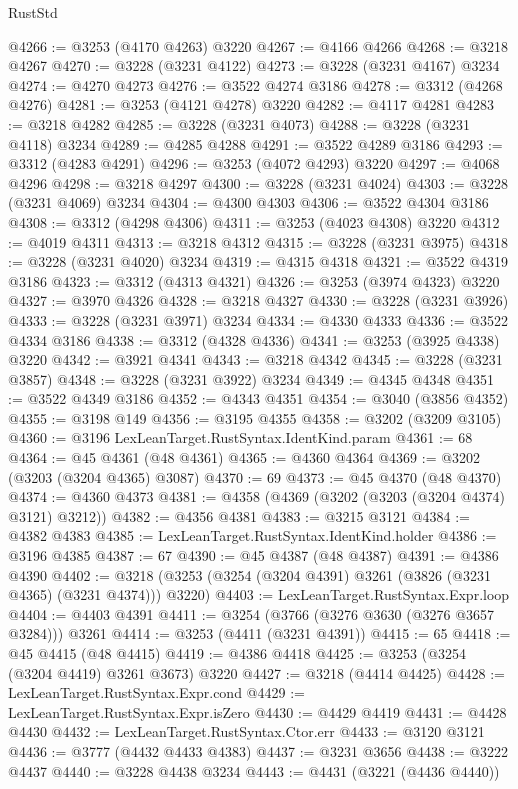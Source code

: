 \begin{lexlean}{RustStd}
\begin{coremodule}
@4266 := @3253 (@4170 @4263) @3220
@4267 := @4166 @4266
@4268 := @3218 @4267
@4270 := @3228 (@3231 @4122)
@4273 := @3228 (@3231 @4167) @3234
@4274 := @4270 @4273
@4276 := @3522 @4274 @3186
@4278 := @3312 (@4268 @4276)
@4281 := @3253 (@4121 @4278) @3220
@4282 := @4117 @4281
@4283 := @3218 @4282
@4285 := @3228 (@3231 @4073)
@4288 := @3228 (@3231 @4118) @3234
@4289 := @4285 @4288
@4291 := @3522 @4289 @3186
@4293 := @3312 (@4283 @4291)
@4296 := @3253 (@4072 @4293) @3220
@4297 := @4068 @4296
@4298 := @3218 @4297
@4300 := @3228 (@3231 @4024)
@4303 := @3228 (@3231 @4069) @3234
@4304 := @4300 @4303
@4306 := @3522 @4304 @3186
@4308 := @3312 (@4298 @4306)
@4311 := @3253 (@4023 @4308) @3220
@4312 := @4019 @4311
@4313 := @3218 @4312
@4315 := @3228 (@3231 @3975)
@4318 := @3228 (@3231 @4020) @3234
@4319 := @4315 @4318
@4321 := @3522 @4319 @3186
@4323 := @3312 (@4313 @4321)
@4326 := @3253 (@3974 @4323) @3220
@4327 := @3970 @4326
@4328 := @3218 @4327
@4330 := @3228 (@3231 @3926)
@4333 := @3228 (@3231 @3971) @3234
@4334 := @4330 @4333
@4336 := @3522 @4334 @3186
@4338 := @3312 (@4328 @4336)
@4341 := @3253 (@3925 @4338) @3220
@4342 := @3921 @4341
@4343 := @3218 @4342
@4345 := @3228 (@3231 @3857)
@4348 := @3228 (@3231 @3922) @3234
@4349 := @4345 @4348
@4351 := @3522 @4349 @3186
@4352 := @4343 @4351
@4354 := @3040 (@3856 @4352)
@4355 := @3198 @149
@4356 := @3195 @4355
@4358 := @3202 (@3209 @3105)
@4360 := @3196 LexLeanTarget.RustSyntax.IdentKind.param
@4361 := 68
@4364 := @45 @4361 (@48 @4361)
@4365 := @4360 @4364
@4369 := @3202 (@3203 (@3204 @4365) @3087)
@4370 := 69
@4373 := @45 @4370 (@48 @4370)
@4374 := @4360 @4373
@4381 := @4358 (@4369 (@3202 (@3203 (@3204 @4374) @3121) @3212))
@4382 := @4356 @4381
@4383 := @3215 @3121
@4384 := @4382 @4383
@4385 := LexLeanTarget.RustSyntax.IdentKind.holder
@4386 := @3196 @4385
@4387 := 67
@4390 := @45 @4387 (@48 @4387)
@4391 := @4386 @4390
@4402 := @3218 (@3253 (@3254 (@3204 @4391) @3261 (@3826 (@3231 @4365) (@3231 @4374))) @3220)
@4403 := LexLeanTarget.RustSyntax.Expr.loop
@4404 := @4403 @4391
@4411 := @3254 (@3766 (@3276 @3630 (@3276 @3657 @3284))) @3261
@4414 := @3253 (@4411 (@3231 @4391))
@4415 := 65
@4418 := @45 @4415 (@48 @4415)
@4419 := @4386 @4418
@4425 := @3253 (@3254 (@3204 @4419) @3261 @3673) @3220
@4427 := @3218 (@4414 @4425)
@4428 := LexLeanTarget.RustSyntax.Expr.cond
@4429 := LexLeanTarget.RustSyntax.Expr.isZero
@4430 := @4429 @4419
@4431 := @4428 @4430
@4432 := LexLeanTarget.RustSyntax.Ctor.err
@4433 := @3120 @3121
@4436 := @3777 (@4432 @4433 @4383)
@4437 := @3231 @3656
@4438 := @3222 @4437
@4440 := @3228 @4438 @3234
@4443 := @4431 (@3221 (@4436 @4440))

\end{coremodule}
\end{lexlean}
